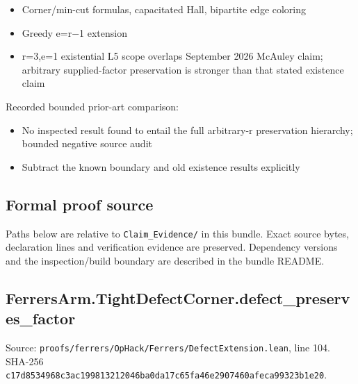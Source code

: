 \documentclass[11pt,a4paper]{article}
\begin{document}
\begin{itemize}
\item Corner/min-cut formulas, capacitated Hall, bipartite edge coloring
\end{itemize}
\begin{itemize}
\item Greedy e=r\ensuremath{-}1 extension
\end{itemize}
\begin{itemize}
\item r=3,e=1 existential L5 scope overlaps September 2026 McAuley claim; arbitrary supplied-factor preservation is stronger than that stated existence claim
\end{itemize}
Recorded bounded prior-art comparison:

\begin{itemize}
\item No inspected result found to entail the full arbitrary-r preservation hierarchy; bounded negative source audit
\end{itemize}
\begin{itemize}
\item Subtract the known boundary and old existence results explicitly
\end{itemize}
\subsection{Formal proof source}
Paths below are relative to \texttt{Claim\_Evidence/} in this bundle. Exact source bytes, declaration lines and verification evidence are preserved. Dependency versions and the inspection/build boundary are described in the bundle README.

\subsection{FerrersArm.TightDefectCorner.defect\_preserves\_factor}
Source: \texttt{proofs/ferrers/OpHack/Ferrers/DefectExtension.lean}, line 104. SHA-256 \texttt{c17d8534968c3ac199813212046ba0da17c65fa46e2907460afeca99323b1e20}.
\end{document}
